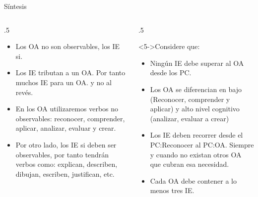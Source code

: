 \documentclass[11pt, aspectratio=169, xcolor=table,hyphens]{beamer}
\begin{document}
\begin{frame}{Síntesis \cite{WESTED2021}}
	\begin{columns}
		\begin{column}{.5\linewidth}
			\begin{itemize}[<+->]
				\item Los OA no son observables, los IE si.
				\item Los IE tributan a un OA. Por tanto muchos IE para un OA. y no al revés.
				\item En los OA utilizaremos verbos no observables: reconocer, comprender, aplicar, analizar, evaluar y crear.
				\item Por otro lado, los IE si deben ser observables, por tanto tendrán verbos como: explican, describen, dibujan, escriben, justifican, etc.
			\end{itemize}
		\end{column}
		\begin{column}{.5\linewidth}
			\begin{block}<5->{Considere que:}
				\begin{itemize}
					\justifying
					\item Ningún IE debe superar al OA desde los PC.
					\item Los OA se diferencian en bajo (Reconocer, comprender y aplicar) y alto nivel cognitivo (analizar, evaluar a crear)
					\item Los IE deben recorrer desde el PC:Reconocer al PC:OA. Siempre y cuando no existan otros OA que cubran esa necesidad.
					\item Cada OA debe contener a lo menos tres IE.
				\end{itemize}
			\end{block}
		\end{column}
	\end{columns}
\end{frame}
\end{document}

